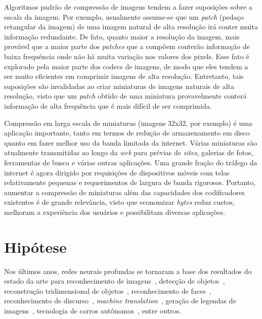 Algoritmos padrão de compressão de imagens tendem a fazer suposições sobre a escala da imagem. Por exemplo, usualmente assume-se que um \textit{patch} (pedaço retangular da imagem) de uma imagem natural de alta resolução irá conter muita informação redundante. De fato, quanto maior a resolução da imagem, mais provável que a maior parte dos \textit{patches} que a compõem conterão informação de baixa frequência onde não há muita variação nos valores dos pixels. Esse fato é explorado pela maior parte dos codecs de imagens, de modo que eles tendem a ser muito eficientes em comprimir imagens de alta resolução. Entretanto, tais suposições são invalidadas ao criar miniaturas de imagens naturais de alta resolução, visto que um \textit{patch} obtido de uma miniatura provavelmente conterá informação de alta frequência que é mais difícil de ser comprimida.

Compressão em larga escala de miniaturas (imagens 32x32, por exemplo) é uma aplicação importante, tanto em termos de redução de armazenamento em disco quanto em fazer melhor uso da banda limitada da internet. Várias miniaturas são atualmente transmitidas ao longo da \textit{web} para prévias de \textit{sites}, galerias de fotos, ferramentas de busca e várias outras aplicações. Uma grande fração do tráfego da internet é agora dirigido por requisições de dispositivos móveis com telas relativamente pequenas e requerimentos de largura de banda rigorosos. Portanto, aumentar a compressão de miniaturas além das capacidades dos codificadores existentes é de grande relevância, visto que economizar \textit{bytes} reduz custos, melhoram a experiência dos usuários e possibilitam diversas aplicações.
\section{Hipótese}
\label{sec:hipotese}
Nos últimos anos, redes neurais profundas se tornaram a base dos resultados do estado da arte para reconhecimento de imagens~\cite{simonyan}, detecção de objetos~\cite{girshick2014rich}, reconstrução tridimensional de objetos~\cite{choy20163d}, reconhecimento de faces~\cite{deepface}, reconhecimento de discurso~\cite{graves}, \textit{machine translation}~\cite{sequence}, geração de legendas de imagens~\cite{vinyals2015show}, tecnologia de carros autônomos~\cite{huval2015empirical}, entre outros. 

